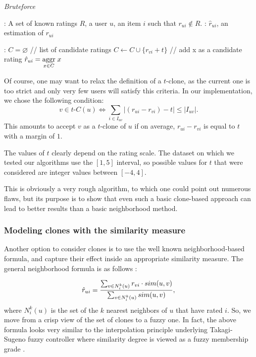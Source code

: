  \begin{algorithm}[!ht]
   \caption{\textit{Bruteforce}}
       \label{algo_straight}
       \begin{algorithmic}

      : A set of known ratings $R$, a user $u$, an item
      $i$ such that $r_{ui} \notin R$.
      : $\hat{r}_{ui}$, an estimation of $r_{ui}$

      :
      \STATE $C = \varnothing$ \quad \quad // list of candidate ratings
          \STATE $C \gets C \cup \{r_{vi} + t\}$ \quad // add x as a candidate rating
          \ENDIF
        \ENDFOR
	    \ENDFOR
    \STATE $\hat{r}_{ui} = \underset{x \in C}{\operatorname{aggr}}\; x$
\end{algorithmic}
\end{algorithm}

Of course, one may want to relax the definition of a $t$-clone, as the current
one is too strict and only very few users will satisfy this criteria. In our
implementation, we chose the following condition:
$$v \in t\text{-}C(u) \iff \sum_{i \in I_{uv}} |(r_{ui} - r_{vi}) - t| \leq |I_{uv}|.$$
This amounts to accept $v$ as a $t$-clone of $u$ if on average, $r_{ui} -
r_{vi}$ is equal to $t$ with a margin of $1$.

The values of $t$ clearly depend on the rating scale. The dataset on which we
tested our algorithms use the $[1, 5]$ interval, so possible values for $t$
that were considered are integer values between $[-4, 4]$.

This is obviously a very rough algorithm, to which one could point out numerous
flaws, but its purpose is to show that even such a basic clone-based approach
can lead to better results than a basic neighborhood method.

\subsubsection{Modeling clones with the similarity measure}
\label{MODELING_CLONES}
Another option to consider clones is to use the well known neighborhood-based
formula, and capture their effect inside an appropriate similarity measure. The
general neighborhood formula is as follows \cite{RecoSystemHandbook}:

$$\hat{r}_{ui} = \frac{\sum_{v \in N_i^k(u)} r_{vi} \cdot sim(u, v)}{\sum_{v \in
  N_i^k(u)} sim(u, v)},$$
where $N_i^k(u)$ is the set of the $k$ nearest neighbors of $u$ that have rated
$i$. So, we move from a crisp view of the set of clones to a fuzzy one. In
fact, the above formula looks very similar to the interpolation principle
underlying Takagi-Sugeno fuzzy controller where similarity degree is viewed as
a fuzzy membership grade \cite{TakSug85}.

